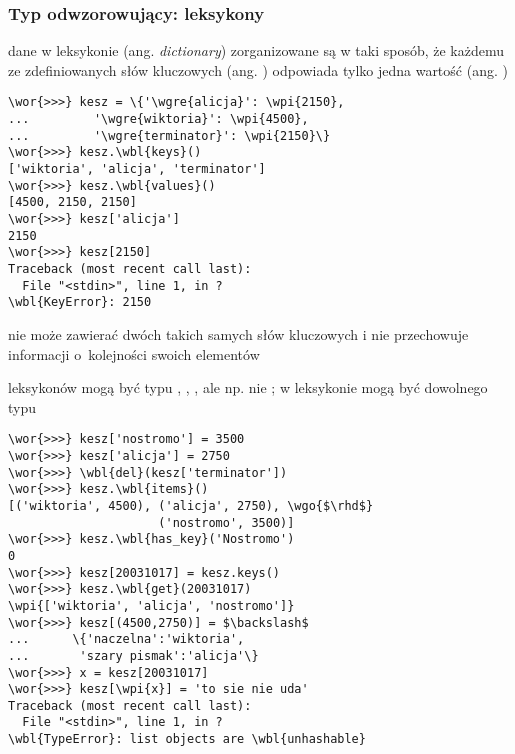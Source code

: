 \begin{frame}[fragile]
\frametitle{Typ odwzorowujący: leksykony}

\begin{minipage}[t]{.49\textwidth}\vspace{0pt}
\raggedright\scriptsize
 dane w leksykonie (ang. \emph{dictionary}) zorganizowane są w
 taki sposób, że każdemu ze zdefiniowanych słów kluczowych (ang.
 \emph{}) odpowiada tylko jedna wartość (ang.
 \emph{})

\begin{Verbatim}[fontsize=\tiny,codes={\catcode`$=3\catcode`^=7},
                 frame=single,framesep=3mm,commandchars=\\\{\}]
\wor{>>>} kesz = \{'\wgre{alicja}': \wpi{2150}, 
...         '\wgre{wiktoria}': \wpi{4500}, 
...         '\wgre{terminator}': \wpi{2150}\}
\wor{>>>} kesz.\wbl{keys}()
['wiktoria', 'alicja', 'terminator']
\wor{>>>} kesz.\wbl{values}()
[4500, 2150, 2150]
\wor{>>>} kesz['alicja']
2150
\wor{>>>} kesz[2150]
Traceback (most recent call last):
  File "<stdin>", line 1, in ?
\wbl{KeyError}: 2150
\end{Verbatim}

 \raggedright
  nie może zawierać dwóch takich samych słów
 kluczowych i nie przechowuje informacji o~kolejności swoich
 elementów


\end{minipage}\hfill%
\begin{minipage}[t]{.49\textwidth}\vspace{0pt}
\scriptsize\raggedright
  leksykonów mogą być
 typu , , ,  ale
 np. nie ;  w leksykonie mogą być dowolnego
 typu

\begin{Verbatim}[fontsize=\tiny,codes={\catcode`$=3\catcode`^=7},
                 frame=single,framesep=3mm,commandchars=\\\{\}]
\wor{>>>} kesz['nostromo'] = 3500
\wor{>>>} kesz['alicja'] = 2750
\wor{>>>} \wbl{del}(kesz['terminator'])
\wor{>>>} kesz.\wbl{items}()
[('wiktoria', 4500), ('alicja', 2750), \wgo{$\rhd$}
                     ('nostromo', 3500)]
\wor{>>>} kesz.\wbl{has_key}('Nostromo')
0
\wor{>>>} kesz[20031017] = kesz.keys()
\wor{>>>} kesz.\wbl{get}(20031017)
\wpi{['wiktoria', 'alicja', 'nostromo']}
\wor{>>>} kesz[(4500,2750)] = $\backslash$
...      \{'naczelna':'wiktoria',
...       'szary pismak':'alicja'\}
\wor{>>>} x = kesz[20031017]
\wor{>>>} kesz[\wpi{x}] = 'to sie nie uda'
Traceback (most recent call last):
  File "<stdin>", line 1, in ?
\wbl{TypeError}: list objects are \wbl{unhashable}
\end{Verbatim}
\end{minipage}
\end{frame}


